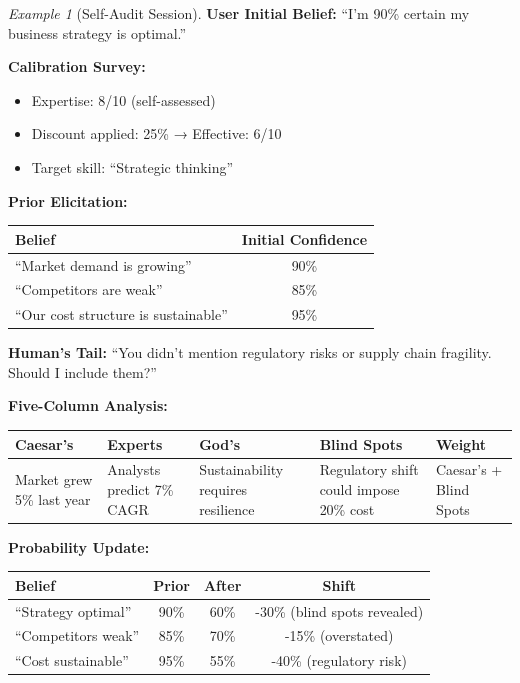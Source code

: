 \documentclass[11pt,a4paper]{article}
\theoremstyle{definition}
\theoremstyle{remark}
\newtheorem{example}{Example}[section]
\begin{document}
\begin{example}[Self-Audit Session]
\textbf{User Initial Belief:} ``I'm 90\% certain my business strategy is optimal.''

\textbf{Calibration Survey:}
\begin{itemize}
    \item Expertise: 8/10 (self-assessed)
    \item Discount applied: 25\% → Effective: 6/10
    \item Target skill: ``Strategic thinking''
\end{itemize}

\textbf{Prior Elicitation:}
\begin{center}
\begin{tabular}{|l|c|}
\hline
\textbf{Belief} & \textbf{Initial Confidence} \\
\hline
``Market demand is growing'' & 90\% \\
``Competitors are weak'' & 85\% \\
``Our cost structure is sustainable'' & 95\% \\
\hline
\end{tabular}
\end{center}

\textbf{Human's Tail:} ``You didn't mention regulatory risks or supply chain fragility. Should I include them?''

\textbf{Five-Column Analysis:}
\begin{center}
\small
\begin{tabular}{|p{2cm}|p{2cm}|p{2cm}|p{2.5cm}|p{1.5cm}|}
\hline
\textbf{Caesar's} & \textbf{Experts} & \textbf{God's} & \textbf{Blind Spots} & \textbf{Weight} \\
\hline
Market grew 5\% last year & Analysts predict 7\% CAGR & Sustainability requires resilience & Regulatory shift could impose 20\% cost & Caesar's + Blind Spots \\
\hline
\end{tabular}
\end{center}

\textbf{Probability Update:}
\begin{center}
\begin{tabular}{|l|c|c|c|}
\hline
\textbf{Belief} & \textbf{Prior} & \textbf{After} & \textbf{Shift} \\
\hline
``Strategy optimal'' & 90\% & 60\% & -30\% (blind spots revealed) \\
``Competitors weak'' & 85\% & 70\% & -15\% (overstated) \\
``Cost sustainable'' & 95\% & 55\% & -40\% (regulatory risk) \\
\hline
\end{tabular}
\end{center}


\end{example}
\end{document}
